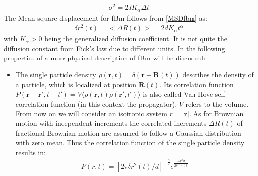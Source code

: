 \documentclass[
  a4paper,BCOR10mm,oneside,
  bibtotoc,idxtotoc,
  headsepline,footsepline,%
  fleqn,openbib
]{scrbook}
\begin{document}
\begin{align}
\label{diffusionvariance}
\sigma^2=2dK_{\alpha} \Delta t
\end{align}
The Mean square displacement for fBm follows from \cref{MSDfbm} as:
\begin{align}
\delta r^{2}(t)= < \Delta R(t)>=2dK_{\alpha} t^{\alpha}
\end{align}
with $K_{\alpha}>0$  being the generalized diffusion coefficient. It is not quite the diffusion constant from Fick's law due to different units.
\newline
In the following properties of a more physical description of fBm will be discussed:
\begin{itemize}
 \item The single particle density $\rho(\bm{r},t)=\delta(\bm{r}-\bm{R}(t))$ describes the density of a particle, which is localized at position $\bm{R}(t)$. Its correlation function $P(\bm{r}-\bm{r}',t-t')= V\langle\rho(\bm{r},t) \rho(\bm{r}',t')\rangle$ is also called Van Hove self-correlation function (in this context the propagator). $V$ refers to the volume. From now on we will consider an isotropic system $ r= |\bm{r}|$. As for Brownian motion with independent increments the correlated increments  $\Delta R(t)$ of fractional Brownian motion are assumed to follow a Gaussian distribution with zero mean. Thus the correlation function of the single particle density results in:
\begin{align}
 P(r,t)=[2 \pi \delta r^{2}(t)/d]^{-\frac{d}{2}} e^{ \frac{-r^2 d}{2 \delta r^{2}(t) }}
\end{align}


\end{itemize}
\end{document}
